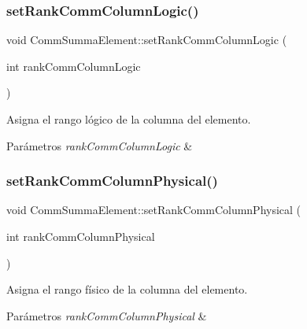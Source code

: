 \subsubsection{\texorpdfstring{set\+Rank\+Comm\+Column\+Logic()}{setRankCommColumnLogic()}}
{\footnotesize\ttfamily void Comm\+Summa\+Element\+::set\+Rank\+Comm\+Column\+Logic (\begin{DoxyParamCaption}\item[{int}]{rank\+Comm\+Column\+Logic }\end{DoxyParamCaption})}



Asigna el rango lógico de la columna del elemento. 


\begin{DoxyParams}{Parámetros}
{\em rank\+Comm\+Column\+Logic} & \\
\hline
\end{DoxyParams}
\mbox{\label{classCommSummaElement_a01ee2b0f2e505649f8c23d5a7350716e}} 
\subsubsection{\texorpdfstring{set\+Rank\+Comm\+Column\+Physical()}{setRankCommColumnPhysical()}}
{\footnotesize\ttfamily void Comm\+Summa\+Element\+::set\+Rank\+Comm\+Column\+Physical (\begin{DoxyParamCaption}\item[{int}]{rank\+Comm\+Column\+Physical }\end{DoxyParamCaption})}



Asigna el rango físico de la columna del elemento. 


\begin{DoxyParams}{Parámetros}
{\em rank\+Comm\+Column\+Physical} & \\
\hline
\end{DoxyParams}
\mbox{\label{classCommSummaElement_a58b5b4178d7ab6adf58c6e864a0dbfff}} 
